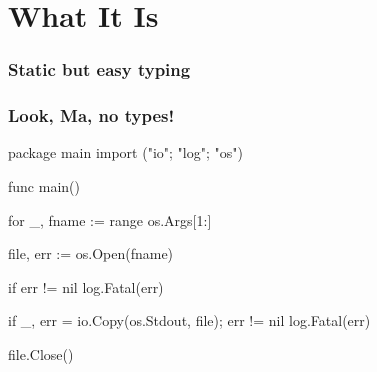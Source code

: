 \documentclass[handout,compress,t,11pt]{beamer}
\begin{document}
\section{What It Is}
\begin{frame}
    \frametitle{Static but easy typing}
    
    \vspace{8\baselineskip}
\end{frame}

\begin{frame}[fragile]
\frametitle{Look, Ma, no types!}
\begin{golang}
package main
import ("io"; "log"; "os")

func main() {
    for _, fname := range os.Args[1:] {
        file, err := os.Open(fname)

        if err != nil {
            log.Fatal(err)
        }

        if _, err = io.Copy(os.Stdout, file); err != nil {
            log.Fatal(err)
        }
        
        file.Close()
    }
}
\end{golang}
\end{frame}
\end{document}
